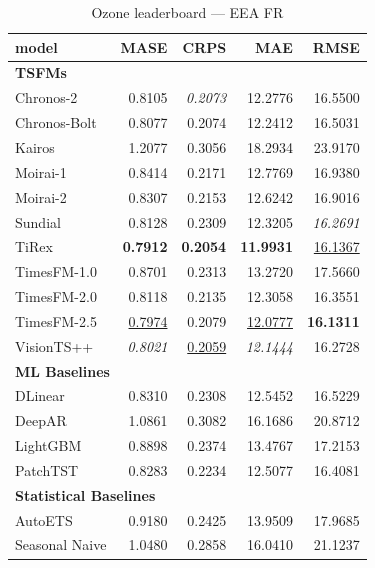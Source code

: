 \begin{table}[H]
\caption{Ozone leaderboard --- EEA FR}
\centering
\begin{small}
\begin{tabular}{lrrrr}
\toprule
model & MASE & CRPS & MAE & RMSE \\
\midrule
\multicolumn{5}{l}{\textbf{TSFMs}} \\
Chronos-2 & 0.8105 & \textit{0.2073} & 12.2776 & 16.5500 \\
Chronos-Bolt & 0.8077 & 0.2074 & 12.2412 & 16.5031 \\
Kairos & 1.2077 & 0.3056 & 18.2934 & 23.9170 \\
Moirai-1 & 0.8414 & 0.2171 & 12.7769 & 16.9380 \\
Moirai-2 & 0.8307 & 0.2153 & 12.6242 & 16.9016 \\
Sundial & 0.8128 & 0.2309 & 12.3205 & \textit{16.2691} \\
TiRex & \textbf{0.7912} & \textbf{0.2054} & \textbf{11.9931} & \underline{16.1367} \\
TimesFM-1.0 & 0.8701 & 0.2313 & 13.2720 & 17.5660 \\
TimesFM-2.0 & 0.8118 & 0.2135 & 12.3058 & 16.3551 \\
TimesFM-2.5 & \underline{0.7974} & 0.2079 & \underline{12.0777} & \textbf{16.1311} \\
VisionTS++ & \textit{0.8021} & \underline{0.2059} & \textit{12.1444} & 16.2728 \\
\midrule
\multicolumn{5}{l}{\textbf{ML Baselines}} \\
DLinear & 0.8310 & 0.2308 & 12.5452 & 16.5229 \\
DeepAR & 1.0861 & 0.3082 & 16.1686 & 20.8712 \\
LightGBM & 0.8898 & 0.2374 & 13.4767 & 17.2153 \\
PatchTST & 0.8283 & 0.2234 & 12.5077 & 16.4081 \\
\midrule
\multicolumn{5}{l}{\textbf{Statistical Baselines}} \\
AutoETS & 0.9180 & 0.2425 & 13.9509 & 17.9685 \\
Seasonal Naive & 1.0480 & 0.2858 & 16.0410 & 21.1237 \\
\bottomrule
\end{tabular}
\end{small}
\end{table}